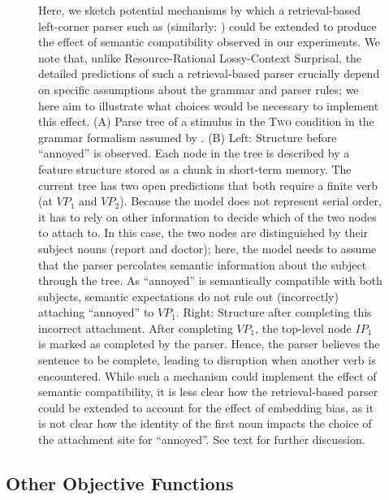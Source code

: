 \begin{figure}
	\caption{Here, we sketch potential mechanisms by which a retrieval-based left-corner parser such as \citet{lewis2005activation} (similarly: \citet{Rasmussen2018LeftCornerPW, Dotlacil2020Parsing}) could be extended to produce the effect of semantic compatibility observed in our experiments. We note that, unlike Resource-Rational Lossy-Context Surprisal, the detailed predictions of such a retrieval-based parser crucially depend on specific assumptions about the grammar and parser rules; we here aim to illustrate what choices would be necessary to implement this effect. (A) Parse tree of a stimulus in the \textsc{Two} condition in the grammar formalism assumed by \citet{lewis2005activation}. (B) Left: Structure before ``annoyed'' is observed. Each node in the tree is described by a feature structure stored as a chunk in short-term memory. The current tree has two open predictions that both require a finite verb (at $VP_1$ and $VP_2$). Because the model does not represent serial order, it has to rely on other information to decide which of the two nodes to attach to. In this case, the two nodes are distinguished by their subject nouns (report and doctor); here, the model needs to assume that the parser percolates semantic information about the subject through the tree. As ``annoyed'' is semantically compatible with both subjects, semantic expectations do not rule out (incorrectly) attaching ``annoyed'' to $VP_1$. Right: Structure after completing this incorrect attachment. After completing $VP_1$, the top-level node $IP_1$ is marked as completed by the parser. Hence, the parser believes the sentence to be complete, leading to disruption when another verb is encountered.
	While such a mechanism could implement the effect of semantic compatibility, it is less clear how the retrieval-based parser could be extended to account for the effect of embedding bias, as it is not clear how the identity of the first noun impacts the choice of the attachment site for ``annoyed''. See text for further discussion.
	}
    \label{fig:retrieval}
\end{figure}



\subsection{Other Objective Functions}

